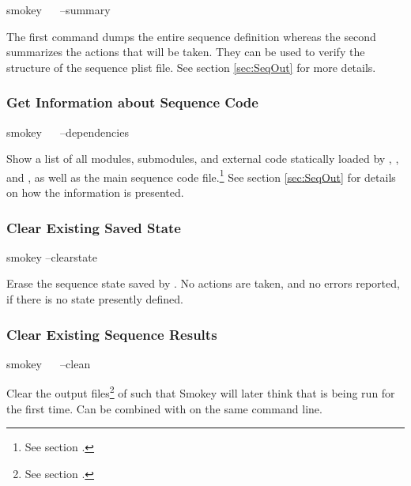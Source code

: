 \begin{CommandLine}
smokey ~~ --summary
\end{CommandLine}

The first command dumps the entire sequence definition whereas the second
summarizes the actions that will be taken.  They can be used to verify the
structure of the sequence plist file.  See section \ref{sec:SeqOut} for more
details.

\subsubsection{Get Information about Sequence Code}

\begin{CommandLine}
smokey ~~ --dependencies
\end{CommandLine}

Show a list of all modules, submodules, and external code statically loaded by
, , and , as well as the main
sequence code file.\footnote{See section
.}  See section \ref{sec:SeqOut} for
details on how the information is presented.

\subsubsection{Clear Existing Saved State}

\begin{CommandLine}
smokey --clearstate
\end{CommandLine}

Erase the sequence state saved by .  No actions are
taken, and no errors reported, if there is no state presently defined.

\subsubsection{Clear Existing Sequence Results}

\begin{CommandLine}
smokey ~~ --clean
\end{CommandLine}

Clear the output files\footnote{See section .} of
 such that Smokey will later think that  is
being run for the first time.  Can be combined with  on the same
command line.

